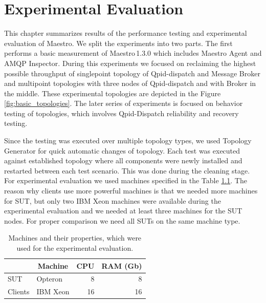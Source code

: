 
\chapter{Experimental Evaluation}
\label{Experimental Evaluation}
This chapter summarizes results of the performance testing and experimental evaluation of Maestro. We split the experiments into two parts. The first performs a basic measurement of Maestro\,1.3.0 which includes Maestro Agent and AMQP Inspector. During this experiments we focused on reclaiming the highest possible throughput of singlepoint topology of Qpid-dispatch and Message Broker and multipoint topologies with three nodes of Qpid-dispatch and with Broker in the middle. These experimental topologies are depicted in the Figure \ref{fig:basic_topologies}. The later series of experiments is focused on behavior testing of topologies, which involves Qpid-Dispatch reliability and recovery testing.

Since the testing was executed over multiple topology types, we used Topology Generator for quick automatic changes of topology. Each test was executed against established topology where all components were newly installed and restarted between each test scenario. This was done during the cleaning stage. For experimental evaluation we used machines specified in the Table \ref{tab:machines}. The reason why clients use more powerful machines is that we needed more machines for SUT, but only two IBM Xeon machines were available during the experimental evaluation and we needed at least three machines for the SUT nodes. For proper comparison we need all SUTs on the same machine type.

\begin{table}[H]
\centering
\caption{Machines and their properties, which were used for the experimental evaluation.}
\label{tab:machines}
\begin{tabular}{|l|l|r|r|}
\hline
\rowcolor[HTML]{C5E3DF}
\textbf{} & \multicolumn{1}{c|}{\cellcolor[HTML]{C5E3DF}\textbf{Machine}} & \multicolumn{1}{c|}{\cellcolor[HTML]{C5E3DF}\textbf{CPU}} & \multicolumn{1}{c|}{\cellcolor[HTML]{C5E3DF}\textbf{RAM (Gb)}} \\ \hline
SUT & Opteron & 8 & 8 \\ \hline
Clients & IBM Xeon & 16 & 16 \\ \hline
\end{tabular}
\end{table}


